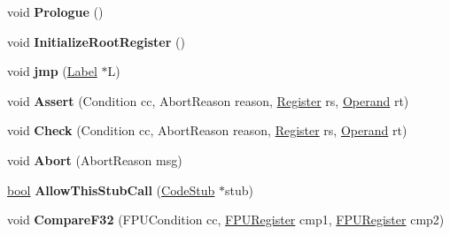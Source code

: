 \begin{DoxyCompactItemize}
void {\bfseries Prologue} ()
\item 
\mbox{\label{classv8_1_1internal_1_1TurboAssembler_a919c742613dc1bcf65b76c2c8dddde57}} 
void {\bfseries Initialize\+Root\+Register} ()
\item 
\mbox{\label{classv8_1_1internal_1_1TurboAssembler_ac9854222d8d5d9aed2704cb2b87919c6}} 
void {\bfseries jmp} (\mbox{\hyperlink{classv8_1_1internal_1_1Label}{Label}} $\ast$L)
\item 
\mbox{\label{classv8_1_1internal_1_1TurboAssembler_ad86c0bbd954aca14fb4af602ed11cb0a}} 
void {\bfseries Assert} (Condition cc, Abort\+Reason reason, \mbox{\hyperlink{classv8_1_1internal_1_1Register}{Register}} rs, \mbox{\hyperlink{classv8_1_1internal_1_1Operand}{Operand}} rt)
\item 
\mbox{\label{classv8_1_1internal_1_1TurboAssembler_a1e86da165a68e2048082eeb0fadebc58}} 
void {\bfseries Check} (Condition cc, Abort\+Reason reason, \mbox{\hyperlink{classv8_1_1internal_1_1Register}{Register}} rs, \mbox{\hyperlink{classv8_1_1internal_1_1Operand}{Operand}} rt)
\item 
\mbox{\label{classv8_1_1internal_1_1TurboAssembler_affb66d8256fd531cd6747647a475a4df}} 
void {\bfseries Abort} (Abort\+Reason msg)
\item 
\mbox{\label{classv8_1_1internal_1_1TurboAssembler_a20348b464d89447388016d14eb6cb7e3}} 
\mbox{\hyperlink{classbool}{bool}} {\bfseries Allow\+This\+Stub\+Call} (\mbox{\hyperlink{classv8_1_1internal_1_1CodeStub}{Code\+Stub}} $\ast$stub)
\item 
\mbox{\label{classv8_1_1internal_1_1TurboAssembler_af60372b3e65c32087bf9d7f31f53977f}} 
void {\bfseries Compare\+F32} (F\+P\+U\+Condition cc, \mbox{\hyperlink{classv8_1_1internal_1_1FPURegister}{F\+P\+U\+Register}} cmp1, \mbox{\hyperlink{classv8_1_1internal_1_1FPURegister}{F\+P\+U\+Register}} cmp2)
\item 
\mbox{\label{classv8_1_1internal_1_1TurboAssembler_a02a065084cb154d1acf410626be1e2c0}} 

\end{DoxyCompactItemize}
